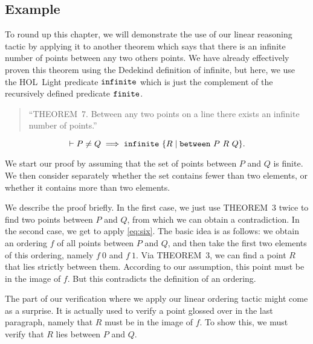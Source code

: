 \subsection{Example}
To round up this chapter, we will demonstrate the use of our linear reasoning tactic  by applying it to another theorem which says that there is an infinite number of points between any two others points. We have already effectively proven this theorem using the Dedekind definition of infinite, but here, we use the HOL~Light predicate $\texttt{infinite}$ which is just the complement of the recursively defined predicate $\texttt{finite}$.

\begin{quote}
  ``THEOREM~7. Between any two points on a line there exists an infinite number of points.''
\end{quote}
\begin{equation*}
\vdash P\neq Q \implies \code{infinite}\ \{R\; \vert\; \between{P}{R}{Q}\}.
\end{equation*}

We start our proof by assuming that the set of points between $P$ and $Q$ is finite. We then consider separately whether the set contains fewer than two elements, or whether it contains more than two elements. 

We describe the proof briefly. In the first case, we just use THEOREM~3 twice to find two points between $P$ and $Q$, from which we can obtain a contradiction. In the second case, we get to apply \ref{eq:six}. The basic idea is as follows: we obtain an ordering $f$ of all points between $P$ and $Q$, and then take the first two elements of this ordering, namely $f\ 0$ and $f\ 1$. Via THEOREM~3, we can find a point $R$ that lies strictly between them. According to our assumption, this point must be in the image of $f$. But this contradicts the definition of an ordering.

The part of our verification where we apply our linear ordering tactic might come as a surprise. It is actually used to verify a point glossed over in the last paragraph, namely that $R$ must be in the image of $f$. To show this, we must verify that $R$ lies between $P$ and $Q$.

